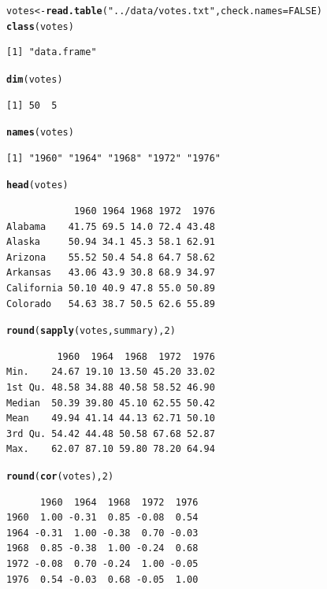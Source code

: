 \documentclass[11pt]{article}\usepackage[]{graphicx}\usepackage[]{xcolor}
\makeatletter
\newcommand{\hlnum}[1]{\textcolor[rgb]{0.686,0.059,0.569}{#1}}%
\newcommand{\hlsng}[1]{\textcolor[rgb]{0.192,0.494,0.8}{#1}}%
\newcommand{\hldef}[1]{\textcolor[rgb]{0.345,0.345,0.345}{#1}}%
\newcommand{\hlkwb}[1]{\textcolor[rgb]{0.69,0.353,0.396}{#1}}%
\newcommand{\hlkwc}[1]{\textcolor[rgb]{0.333,0.667,0.333}{#1}}%
\newcommand{\hlkwd}[1]{\textcolor[rgb]{0.737,0.353,0.396}{\textbf{#1}}}%
\newenvironment{kframe}{%
 \def\at@end@of@kframe{}%
 \ifinner\ifhmode%
  \def\at@end@of@kframe{\end{minipage}}%
  \begin{minipage}{\columnwidth}%
 \fi\fi%
 \def\FrameCommand##1{\hskip\@totalleftmargin \hskip-\fboxsep
 \colorbox{shadecolor}{##1}\hskip-\fboxsep
     \hskip-\linewidth \hskip-\@totalleftmargin \hskip\columnwidth}%
 \MakeFramed {\advance\hsize-\width
   \@totalleftmargin\z@ \linewidth\hsize
   \@setminipage}}%
 {\par\unskip\endMakeFramed%
 \at@end@of@kframe}
\newenvironment{knitrout}{}{} %
\makeatother
\begin{document}
\begin{knitrout}\small
{}\color{fgcolor}\begin{kframe}
\begin{alltt}
\hldef{votes} \hlkwb{<-} \hlkwd{read.table}\hldef{(}\hlsng{"../data/votes.txt"}\hldef{,} \hlkwc{check.names} \hldef{=} \hlnum{FALSE}\hldef{)}
\hlkwd{class}\hldef{(votes)}
\end{alltt}
\begin{verbatim}
[1] "data.frame"
\end{verbatim}
\begin{alltt}
\hlkwd{dim}\hldef{(votes)}
\end{alltt}
\begin{verbatim}
[1] 50  5
\end{verbatim}
\begin{alltt}
\hlkwd{names}\hldef{(votes)}
\end{alltt}
\begin{verbatim}
[1] "1960" "1964" "1968" "1972" "1976"
\end{verbatim}
\begin{alltt}
\hlkwd{head}\hldef{(votes)}
\end{alltt}
\begin{verbatim}
            1960 1964 1968 1972  1976
Alabama    41.75 69.5 14.0 72.4 43.48
Alaska     50.94 34.1 45.3 58.1 62.91
Arizona    55.52 50.4 54.8 64.7 58.62
Arkansas   43.06 43.9 30.8 68.9 34.97
California 50.10 40.9 47.8 55.0 50.89
Colorado   54.63 38.7 50.5 62.6 55.89
\end{verbatim}
\begin{alltt}
\hlkwd{round}\hldef{(}\hlkwd{sapply}\hldef{(votes, summary),} \hlnum{2}\hldef{)}
\end{alltt}
\begin{verbatim}
         1960  1964  1968  1972  1976
Min.    24.67 19.10 13.50 45.20 33.02
1st Qu. 48.58 34.88 40.58 58.52 46.90
Median  50.39 39.80 45.10 62.55 50.42
Mean    49.94 41.14 44.13 62.71 50.10
3rd Qu. 54.42 44.48 50.58 67.68 52.87
Max.    62.07 87.10 59.80 78.20 64.94
\end{verbatim}
\begin{alltt}
\hlkwd{round}\hldef{(}\hlkwd{cor}\hldef{(votes),} \hlnum{2}\hldef{)}
\end{alltt}
\begin{verbatim}
      1960  1964  1968  1972  1976
1960  1.00 -0.31  0.85 -0.08  0.54
1964 -0.31  1.00 -0.38  0.70 -0.03
1968  0.85 -0.38  1.00 -0.24  0.68
1972 -0.08  0.70 -0.24  1.00 -0.05
1976  0.54 -0.03  0.68 -0.05  1.00
\end{verbatim}
\end{kframe}
\end{knitrout}
\end{document}
